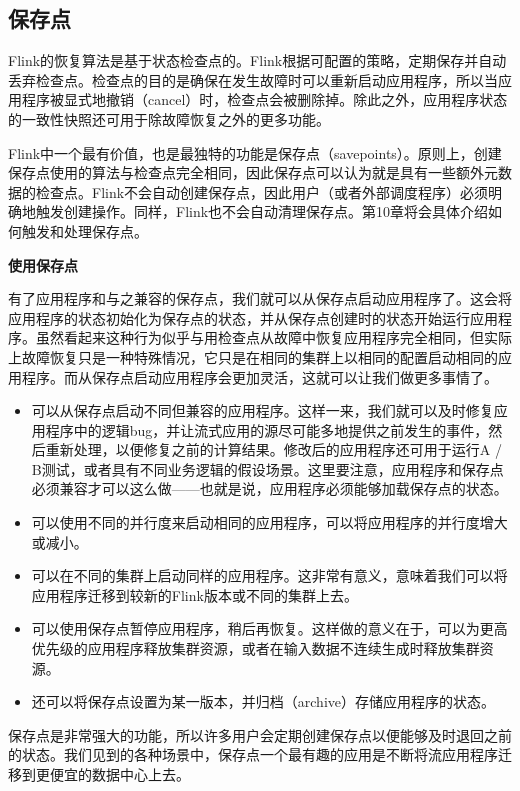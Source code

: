 \documentclass[cn,11pt,chinese]{elegantbook}
\begin{document}
\subsection{保存点}

Flink的恢复算法是基于状态检查点的。Flink根据可配置的策略，定期保存并自动丢弃检查点。检查点的目的是确保在发生故障时可以重新启动应用程序，所以当应用程序被显式地撤销（cancel）时，检查点会被删除掉。除此之外，应用程序状态的一致性快照还可用于除故障恢复之外的更多功能。

Flink中一个最有价值，也是最独特的功能是保存点（savepoints）。原则上，创建保存点使用的算法与检查点完全相同，因此保存点可以认为就是具有一些额外元数据的检查点。Flink不会自动创建保存点，因此用户（或者外部调度程序）必须明确地触发创建操作。同样，Flink也不会自动清理保存点。第10章将会具体介绍如何触发和处理保存点。

\textbf{使用保存点}

有了应用程序和与之兼容的保存点，我们就可以从保存点启动应用程序了。这会将应用程序的状态初始化为保存点的状态，并从保存点创建时的状态开始运行应用程序。虽然看起来这种行为似乎与用检查点从故障中恢复应用程序完全相同，但实际上故障恢复只是一种特殊情况，它只是在相同的集群上以相同的配置启动相同的应用程序。而从保存点启动应用程序会更加灵活，这就可以让我们做更多事情了。

\begin{itemize}
\item 可以从保存点启动不同但兼容的应用程序。这样一来，我们就可以及时修复应用程序中的逻辑bug，并让流式应用的源尽可能多地提供之前发生的事件，然后重新处理，以便修复之前的计算结果。修改后的应用程序还可用于运行A / B测试，或者具有不同业务逻辑的假设场景。这里要注意，应用程序和保存点必须兼容才可以这么做——也就是说，应用程序必须能够加载保存点的状态。
\item 可以使用不同的并行度来启动相同的应用程序，可以将应用程序的并行度增大或减小。
\item 可以在不同的集群上启动同样的应用程序。这非常有意义，意味着我们可以将应用程序迁移到较新的Flink版本或不同的集群上去。
\item 可以使用保存点暂停应用程序，稍后再恢复。这样做的意义在于，可以为更高优先级的应用程序释放集群资源，或者在输入数据不连续生成时释放集群资源。
\item 还可以将保存点设置为某一版本，并归档（archive）存储应用程序的状态。
\end{itemize}

保存点是非常强大的功能，所以许多用户会定期创建保存点以便能够及时退回之前的状态。我们见到的各种场景中，保存点一个最有趣的应用是不断将流应用程序迁移到更便宜的数据中心上去。
\end{document}
